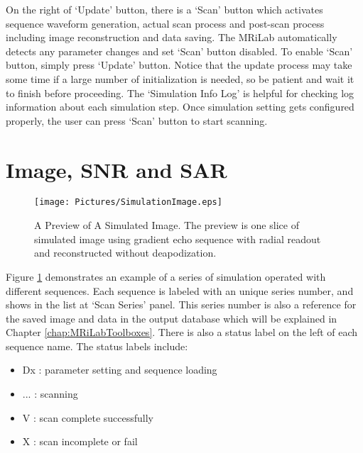 \documentclass{book}%
\begin{document}
On the right of `Update' button, there is a `Scan' button which activates sequence waveform generation, actual scan process and post-scan process including image reconstruction and data saving. The MRiLab automatically detects any parameter changes and set `Scan' button disabled. To enable `Scan' button, simply press `Update' button. Notice that the update process may take some time if a large number of initialization is needed, so be patient and wait it to finish before proceeding. The `Simulation Info Log' is helpful for checking log information about each simulation step. Once simulation setting gets configured properly, the user can press `Scan' button to start scanning.

\section{Image, SNR and SAR}

\begin{figure}[htbp]
	\centering
		\texttt{[image: Pictures/SimulationImage.eps]}
	\caption{A Preview of A Simulated Image. The preview is one slice of simulated image using gradient echo sequence with radial readout and reconstructed without deapodization.}
	\label{fig:SimulationImage}
\end{figure}

Figure \ref{fig:SimulationImage} demonstrates an example of a series of simulation operated with different sequences. Each sequence is labeled with an unique series number, and shows in the list at `Scan Series' panel. This series number is also a reference for the saved image and data in the output database which will be explained in Chapter \ref{chap:MRiLabToolboxes}. There is also a status label on the left of each sequence name. The status labels include:

\begin{itemize}
	\item Dx : parameter setting and sequence loading
	\item ... : scanning
	\item V :  scan complete successfully
	\item X : scan incomplete or fail
\end{itemize}
\end{document}
